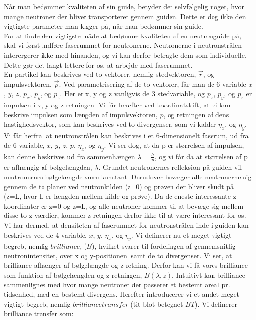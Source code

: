 \documentclass[12pt,oneside,a4paper]{article}
\begin{document}
{{{{{Når man bedømmer kvaliteten af sin guide, betyder det selvfølgelig noget, hvor mange neutroner der bliver transporteret gennem guiden. Dette er dog ikke den vigtigste parameter man kigger på, når man bedømmer sin guide. 
\\
For at finde den vigtigste måde at bedømme kvaliteten af en neutronguide på, skal vi først indføre faserummet for neutronerne. Neutronerne i neutronstrålen interergerer ikke med hinanden, og vi kan derfor betragte dem som individuelle. Dette gør det langt lettere for os, at arbejde med faserummet. 
\\
En partikel kan beskrives ved to vektorer, nemlig stedvektoren, $\vec{r}$, og impulsvektoren, $\vec{p}$. Ved parametrisering af de to vektorer, får man de 6 variable $x$, $y$, $z$, $p_x$, $p_y$, og $p_z$. Her er x, y og z vanligvis de 3 stedvariable, og $p_x$, $p_y$, og $p_z$ er impulsen i x, y og z retningen. Vi får herefter ved koordinatskift, at vi kan beskrive impulsen som længden af impulsvektoren, $p$, og retningen af dens hastighedsvektor, som kan beskrives ved to divergenser, som vi kalder $\eta_x$, og $\eta_y$.
Vi får herfra, at neutronstrålen kan beskrives i et 6-dimensionelt faserum, ud fra de 6 variable, $x$, $y$, $z$, $p$, $\eta_x$, og $\eta_y$. Vi ser dog, at da p er størrelsen af impulsen, kan denne  beskrives ud fra sammenhængen $\lambda=\frac{h}{p}$, og vi får da at størrelsen af p er afhængig af bølgelængden, $\lambda$. Grundet neutronernes refleksion på guiden vil neutronernes bølgelængde være konstant. Derudover bevæger alle neutronerne sig gennem de to planer ved neutronkilden (z=0) og prøven der bliver skudt på (z=L, hvor L er længden mellem kilde og prøve). Da de eneste interessante z-koordinater er z=0 og z=L, og alle neutroner kommer til at bevæge sig mellem disse to z-værdier, kommer z-retningen derfor ikke til at være interessant for os. Vi har dermed, at densiteten af faserummet for neutronstrålen inde i guiden kan beskrives ved de 4 variable,  $x$, $y$, $\eta_x$, og $\eta_y$. Vi definerer nu et meget vigtigt begreb, nemlig $brilliance$, ($B$), hvilket svarer til fordelingen af gennemsnitlig neutronintensitet, over x og y-positionen, samt de to divergenser. Vi ser, at brilliance afhænger af bølgelængde og z-retning. Derfor kan vi få vores brilliance som funktion af bølgelængden og z-retningen, $B(\lambda,z)$. Intuitivt kan brilliance sammenlignes med hvor mange neutroner der passerer et bestemt areal pr. tidsenhed, med en bestemt divergens. Herefter introducerer vi et andet meget vigtigt begreb, nemlig $brilliance transfer$ (tit blot betegnet $BT$). Vi definerer brilliance transfer som:

}}}}}
\end{document}

